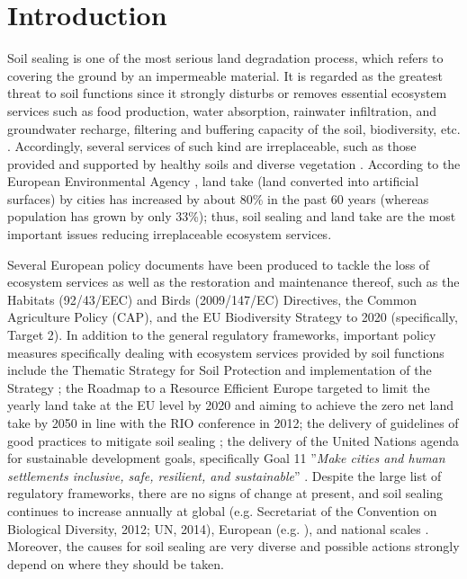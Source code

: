 \documentclass[APA,LATO1COL,doublespace]{WileyNJD-v2}
\begin{document}
\section{Introduction}\label{sec1}
Soil sealing is one of the most serious land degradation process, which refers to covering the ground by an impermeable material.
It is regarded as the greatest threat to soil functions since it strongly disturbs or removes essential ecosystem services such as food production, water absorption, rainwater infiltration, and groundwater recharge, filtering and buffering capacity of the soil, biodiversity, etc. \citep{FAO15}.
Accordingly, several services of such kind are irreplaceable, such as those provided and supported by healthy soils and diverse vegetation \citep{Dunbar13}.
According to the European Environmental Agency \citep{EEA2011}, land take (land converted into artificial surfaces) by cities has increased by about 80\% in the past 60 years (whereas population has grown by only 33\%); thus, soil sealing and land take are the most important issues reducing irreplaceable ecosystem services.

Several European policy documents have been produced to tackle the loss of ecosystem services as well as the restoration and maintenance thereof, such as the Habitats (92/43/EEC) and Birds (2009/147/EC) Directives, the Common Agriculture Policy (CAP), and the EU Biodiversity Strategy to 2020 (specifically, Target 2).
In addition to the general regulatory frameworks, important policy measures specifically dealing with ecosystem services provided by soil functions include the Thematic Strategy for Soil Protection \citep{EC2006} and implementation of the Strategy \citep{EC2012}; the Roadmap to a Resource Efficient Europe \citep{EC2011a} targeted to limit the yearly land take at the EU level by 2020 and aiming to achieve the zero net land take by 2050 in line with the RIO conference in 2012; the delivery of guidelines of good practices to mitigate soil sealing \citep{SWD12}; the delivery of the United Nations agenda \citep{UN15} for sustainable development goals, specifically Goal 11 ''\textit{Make cities and human settlements inclusive, safe, resilient, and sustainable}'' \citep{Keesstra16}.
Despite the large list of regulatory frameworks, there are no signs of change at present, and soil sealing continues to increase annually \citep{FAO15} at global (e.g. Secretariat of the Convention on Biological Diversity, 2012; UN, 2014), European (e.g. \citealp{SWD12}), and national scales \citep[e.g.][Copernicus Land Monitoring Service\footnote{ http://land.copernicus.eu}]{ISPRA16,ISPRA18}.
Moreover, the causes for soil sealing are very diverse and possible actions strongly depend on where they should be taken.
\end{document}
